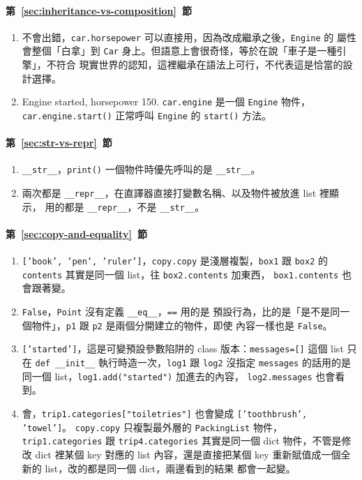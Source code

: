 \paragraph{第~\ref{sec:inheritance-vs-composition}~節}
\begin{enumerate}
\item 不會出錯，\texttt{car.horsepower} 可以直接用，因為改成繼承之後，\texttt{Engine} 的
屬性會整個「白拿」到 \texttt{Car} 身上。但語意上會很奇怪，等於在說「車子是一種引擎」，不符合
現實世界的認知，這裡繼承在語法上可行，不代表這是恰當的設計選擇。
\item Engine started, horsepower 150. \texttt{car.engine} 是一個 \texttt{Engine} 物件，
\texttt{car.engine.start()} 正常呼叫 \texttt{Engine} 的 \texttt{start()} 方法。
\end{enumerate}

\paragraph{第~\ref{sec:str-vs-repr}~節}
\begin{enumerate}
\item \texttt{\_\_str\_\_}，\texttt{print()} 一個物件時優先呼叫的是 \texttt{\_\_str\_\_}。
\item 兩次都是 \texttt{\_\_repr\_\_}，在直譯器直接打變數名稱、以及物件被放進 list 裡顯示，
用的都是 \texttt{\_\_repr\_\_}，不是 \texttt{\_\_str\_\_}。
\end{enumerate}

\paragraph{第~\ref{sec:copy-and-equality}~節}
\begin{enumerate}
\item \texttt{['book', 'pen', 'ruler']}，\texttt{copy.copy} 是淺層複製，\texttt{box1} 跟
\texttt{box2} 的 \texttt{contents} 其實是同一個 list，往 \texttt{box2.contents} 加東西，
\texttt{box1.contents} 也會跟著變。
\item \texttt{False}，\texttt{Point} 沒有定義 \texttt{\_\_eq\_\_}，\texttt{==} 用的是
預設行為，比的是「是不是同一個物件」，\texttt{p1} 跟 \texttt{p2} 是兩個分開建立的物件，即使
內容一樣也是 \texttt{False}。
\item \texttt{['started']}，這是可變預設參數陷阱的 class 版本：\texttt{messages=[]} 這個
list 只在 \texttt{def \_\_init\_\_} 執行時造一次，\texttt{log1} 跟 \texttt{log2} 沒指定
\texttt{messages} 的話用的是同一個 list，\texttt{log1.add("started")} 加進去的內容，
\texttt{log2.messages} 也會看到。
\item 會，\texttt{trip1.categories["toiletries"]} 也會變成 \texttt{['toothbrush', 'towel']}。
\texttt{copy.copy} 只複製最外層的 \texttt{PackingList} 物件，\texttt{trip1.categories} 跟
\texttt{trip4.categories} 其實是同一個 dict 物件，不管是修改 dict 裡某個 key 對應的 list
內容，還是直接把某個 key 重新賦值成一個全新的 list，改的都是同一個 dict，兩邊看到的結果
都會一起變。
\end{enumerate}
